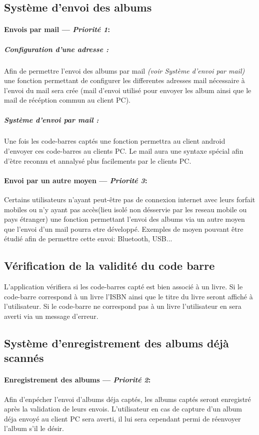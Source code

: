 \subsection{Système d'envoi des albums}
\paragraph{Envois par mail ---  \textit{Priorité 1}:}
\subparagraph{Configuration d'une adresse :}
Afin de permettre l'envoi des albums par mail \textit{(voir Système d'envoi par mail)} une fonction permettant de configurer les differentes adresses mail nécessaire à l'envoi du mail sera crée (mail d'envoi utilisé pour envoyer les album ainsi que le mail de récéption commun au client PC).

\subparagraph{Système d'envoi par mail :} 
Une fois les code-barres captés une fonction permettra au client android d'envoyer ces code-barres au clients PC. 
Le mail aura une syntaxe spécial afin d'ètre reconnu et annalysé plus facilements par le clients PC. 

\paragraph{Envoi par un autre moyen ---  \textit{Priorité 3}:}
Certains utilisateurs n'ayant peut-être pas de connexion internet avec leurs forfait mobiles ou n'y ayant pas accès(lieu isolé non désservie par les reseau mobile ou pays étranger) une fonction permettant l'envoi des albums via un autre moyen que l'envoi d'un mail pourra etre développé.
Exemples de moyen pouvant être étudié afin de permettre cette envoi: Bluetooth, USB...

\subsection{Vérification de la validité du code barre}
L'application vérifiera si les code-barres capté est bien associé à un livre.
Si le code-barre correspond à un livre l'ISBN ainsi que le titre du livre seront affiché à l'utilisateur.
Si le code-barre ne correspond pas à un livre l'utilisateur en sera averti via un message d'erreur.

\subsection{Système d'enregistrement des albums déjà scannés}
\paragraph{Enregistrement des albums ---  \textit{Priorité 2}:} 
Afin d'enpécher l'envoi d'albums déja captés, les albums captés seront enregistré après la validation de leurs envois. 
L'utilisateur en cas de capture d'un album déja envoyé au client PC sera averti, il lui sera cependant permi de réenvoyer l'album s'il le désir.

